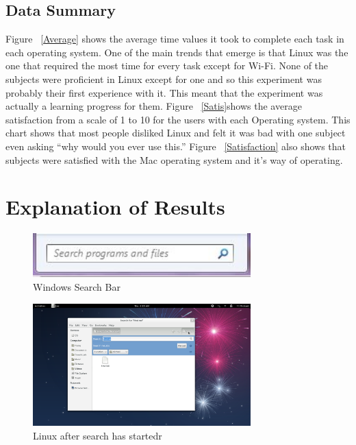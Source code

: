 \documentclass[11pt]{article}
\begin{document}
\subsection{Data Summary}
Figure ~\ref{Average} shows the average time values it took to complete each task in each operating system. One of the main trends that emerge is that Linux was the one that required the most time for every task except for Wi-Fi. None of the subjects were proficient in Linux except for one and so this experiment was probably their first experience with it. This meant that the experiment was actually a learning progress for them. Figure ~\ref{Satis}shows the average satisfaction from a scale of 1 to 10 for the users with each Operating system. This chart shows that most people disliked Linux and felt it was bad with one subject even asking “why would you ever use this.” Figure ~\ref{Satisfaction} also shows that subjects were satisfied with the Mac operating system and it's way of operating.

\section{Explanation of Results}

\begin{figure}[h!]
  \centering
    \includegraphics[width=0.75\textwidth]{./Images/Search_Windows}
  \caption{Windows Search Bar}
 \label{SearchWin}
\end{figure}

\begin{figure}[h!]
  \centering
    \includegraphics[width=0.75\textwidth]{./Images/Linux_Search_After}
  \caption{Linux after search has startedr}
 \label{SearchLinAfter}
\end{figure}
\end{document}
